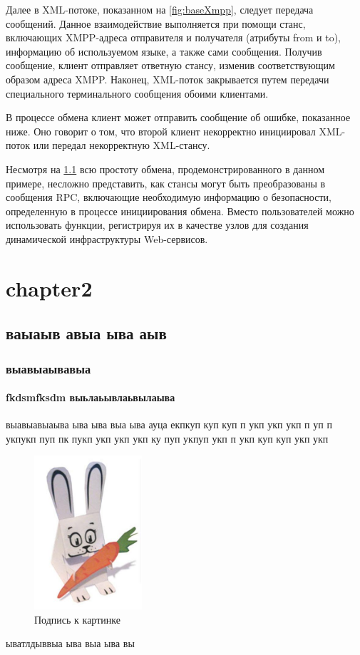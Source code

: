 \documentclass{khaireport}
\begin{document}
Далее в XML-потоке, показанном на \ref{fig:baseXmpp}, следует передача сообщений. Данное взаимодействие выполняется при помощи станс, включающих XMPP-адреса отправителя и получателя (атрибуты from и to), информацию об используемом языке, а также сами сообщения. Получив сообщение, клиент отправляет ответную стансу, изменив соответствующим образом адреса XMPP. Наконец, XML-поток закрывается путем передачи специального терминального сообщения обоими клиентами.

В процессе обмена клиент может отправить сообщение об ошибке, показанное ниже. Оно говорит о том, что второй клиент некорректно инициировал XML-поток или передал некорректную XML-стансу.

Несмотря на \ref{fig:hist} всю простоту обмена, продемонстрированного в данном примере, несложно представить, как стансы могут быть преобразованы в сообщения RPC, включающие необходимую информацию о безопасности, определенную в процессе инициирования обмена. Вместо пользователей можно использовать функции, регистрируя их в качестве узлов для создания динамической инфраструктуры Web-сервисов.


\chapter{chapter2}
\section{ваыаыв авыа ыва аыв}
\subsection{выавыаывавыа}
\subsubsection{fkdsmfksdm выьлаьывлаьвылаыва}
выавыавыаыва ыва ыва выа ыва ауца екпкуп
куп куп п укп укп укп п уп п укпукп
пуп  пк пукп укп укп укп ку пуп укпуп укп
п укп куп куп укп укп
\begin{figure}[!ht]
\centering
\includegraphics[width = 4cm]{images/123.jpeg} 
\caption{Подпись к картинке}
\label{fig:hist}
\end{figure}
ыватлдыввыа ыва выа ыва вы
\end{document}

